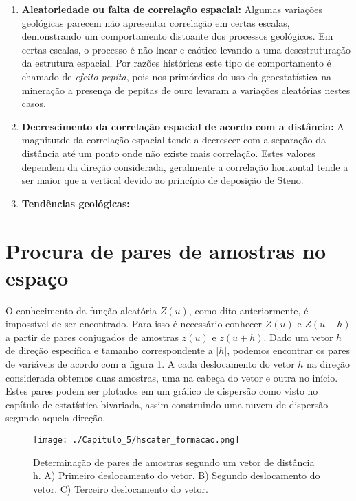  \begin{enumerate}
 	\item \textbf{Aleatoriedade ou falta de correlação espacial:} Algumas variações geológicas parecem não apresentar correlação em certas escalas, demonstrando um comportamento distoante dos processos geológicos. Em certas escalas, o processo é não-lnear e caótico levando a uma desestruturação da estrutura espacial. Por razões históricas este tipo de comportamento é chamado de \textit{efeito pepita}, pois nos primórdios do uso da geoestatística na mineração a presença de pepitas de ouro levaram a variações aleatórias nestes casos.  
 	\item \textbf{Decrescimento da correlação espacial de acordo com a distância:} A magnitutde da correlação espacial tende a decrescer com a separação da distância até um ponto onde não existe mais correlação. Estes valores dependem da direção considerada, geralmente a correlação horizontal tende a ser maior que a vertical devido ao princípio de deposição de Steno. 
 	\item \textbf{Tendências geológicas:} 
 \end{enumerate}
 

\section{Procura de pares de amostras no espaço}

O conhecimento da função aleatória $Z(u)$, como dito anteriormente, é impossível de ser encontrado. Para isso é necessário conhecer $Z(u)$ e $Z(u+h)$ a partir de pares conjugados de amostras $z(u)$ e $z(u+h)$. Dado um vetor $h$ de direção específica e tamanho correspondente a $|h|$, podemos encontrar os pares de variáveis de acordo com a figura \ref{pares_amostras_lag}. A cada deslocamento do vetor $h$ na direção considerada obtemos duas amostras, uma na cabeça do vetor e outra no início. Estes pares podem ser plotados em um gráfico de dispersão como visto no capítulo de estatística bivariada, assim construindo uma nuvem de dispersão segundo aquela direção. 

\FloatBarrier
\begin{figure}[!htb]
	\centering
	\texttt{[image: ./Capitulo\_5/hscater\_formacao.png]}
	\caption{Determinação de pares de amostras segundo um vetor de distância h. A) Primeiro deslocamento do vetor. B) Segundo deslocamento do vetor. C) Terceiro deslocamento do vetor.}
	\label{pares_amostras_lag}
\end{figure}
\FloatBarrier

